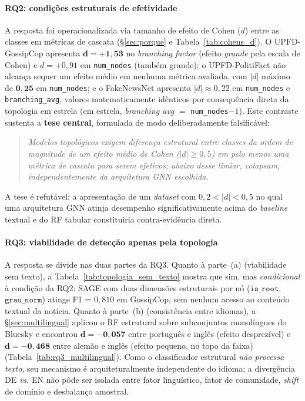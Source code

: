 \paragraph{RQ2: condi\c{c}\~oes estruturais de efetividade} A resposta foi
operacionalizada via tamanho de efeito de Cohen ($d$) entre as classes
em m\'etricas de cascata (\S\ref{sec:porque} e
Tabela~\ref{tab:cohens_d}). O UPFD-GossipCop apresenta $\mathbf{d =
+1{,}53}$ no \emph{branching factor} (efeito \emph{grande} pela escala
de Cohen) e $d = +0{,}91$ em \texttt{num\_nodes} (tamb\'em grande); o
UPFD-PolitiFact n\~ao alcan\c{c}a sequer um efeito m\'edio em nenhuma
m\'etrica avaliada, com $|d|$ m\'aximo de $\mathbf{0{,}25}$ em
\texttt{num\_nodes}; e o FakeNewsNet apresenta $|d| \approx 0{,}22$ em
\texttt{num\_nodes} e \texttt{branching\_avg}, valores
matematicamente id\^enticos por consequ\^encia direta da topologia em
estrela (em estrela, \emph{branching avg} $=$ \texttt{num\_nodes}$-1$).
Este contraste sustenta a \textbf{tese central}, formulada de modo
deliberadamente falsific\'avel:

\begin{quote}
\emph{Modelos topol\'ogicos exigem diferen\c{c}a estrutural entre classes
da ordem de magnitude de um efeito m\'edio de Cohen ($|d| \geq 0{,}5$) em
pelo menos uma m\'etrica de cascata para serem efetivos; abaixo desse
limiar, colapsam, independentemente da arquitetura GNN escolhida.}
\end{quote}

A tese \'e refut\'avel: a apresenta\c{c}\~ao de um \emph{dataset} com
$0{,}2 < |d| < 0{,}5$ no qual uma arquitetura GNN atinja desempenho
significativamente acima do \emph{baseline} textual e do RF tabular
constituiria contra-evid\^encia direta.

\paragraph{RQ3: viabilidade de detec\c{c}\~ao apenas pela topologia} A resposta se divide nas duas partes da RQ3. Quanto \`a parte~(a) (viabilidade sem texto), a Tabela~\ref{tab:topologia_sem_texto} mostra que sim, mas
\emph{condicional} \`a condi\c{c}\~ao da RQ2: SAGE com duas dimens\~oes
estruturais por n\'o ($\texttt{is\_root}$, $\texttt{grau\_norm}$) atinge
F1 = $0{,}810$ em GossipCop, sem nenhum acesso ao conte\'udo textual da
not\'icia. Quanto \`a parte~(b) (consist\^encia entre idiomas), a \S\ref{sec:multilingual} aplicou o RF estrutural
sobre subconjuntos monol\'ingues do Bluesky e encontrou $\mathbf{d =
-0{,}057}$ entre portugu\^es e ingl\^es (efeito desprez\'ivel) e
$\mathbf{d = -0{,}468}$ entre alem\~ao e ingl\^es (efeito pequeno, no topo da faixa)
(Tabela~\ref{tab:rq3_multilingual}). Como o classificador estrutural
\emph{n\~ao processa texto}, seu mecanismo \'e arquiteturalmente
independente do idioma; a diverg\^encia DE \emph{vs.} EN n\~ao p\^ode
ser isolada entre fator lingu\'istico, fator de comunidade, \emph{shift}
de dom\'inio e desbalan\c{c}o amostral.

